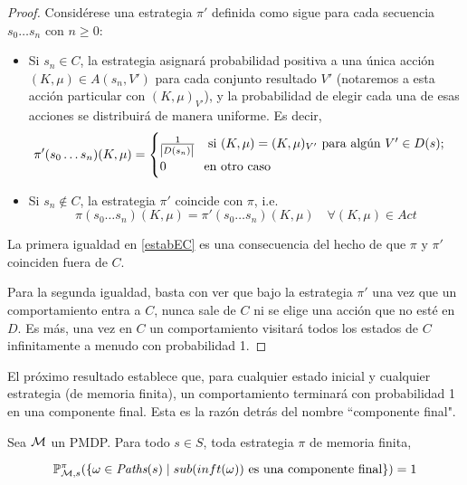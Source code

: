 \begin{proof}
	Considérese una estrategia $\pi'$ definida como sigue para cada secuencia $s_0 \dots s_n$ con $n \geq 0$:

	\begin{itemize}
		\item Si $s_n \in C$, la estrategia asignará probabilidad positiva a una única acción
		      $(K, \mu) \in A(s_n, V')$ para cada conjunto resultado $V'$ (notaremos a esta
		      acción particular con $(K, \mu)_{V'}$), y la probabilidad de elegir cada una de
		      esas acciones se distribuirá de manera uniforme. Es decir,
		      \[
			      \pi'(s_0 \dots s_n)(K, \mu) =
			      \begin{cases}
				      \frac{1}{\abs{D(s_n)}} \quad \text{si } (K, \mu) = (K, \mu)_{V'} \text{ para algún } V' \in D(s); \\
				      0 \qquad \quad \text{en otro caso}
			      \end{cases}
		      \]

		\item Si $s_n \notin C$, la estrategia $\pi'$ coincide con $\pi$, i.e.
		      \[
			      \pi(s_0 \dots s_n)(K, \mu) = \pi'(s_0\dots s_n)(K, \mu) \quad \forall (K, \mu) \in Act
		      \]

	\end{itemize}

	La primera igualdad en \ref{estabEC} es una consecuencia del hecho de que $\pi$
	y $\pi'$ coinciden fuera de $C$.

	Para la segunda igualdad, basta con ver que bajo la estrategia $\pi'$ una vez
	que un comportamiento entra a $C$, nunca sale de $C$ ni se elige una acción que
	no esté en $D$. Es más, una vez en $C$ un comportamiento visitará todos los
	estados de $C$ infinitamente a menudo con probabilidad 1.
\end{proof}

El próximo resultado establece que, para cualquier estado inicial y cualquier
estrategia (de memoria finita), un comportamiento terminará con probabilidad 1
en una componente final. Esta es la razón detrás del nombre ``componente
final".

\begin{theorem} \label{teoFundEC}
	Sea $\mathcal{M}$ un PMDP. Para todo $s \in S$, toda estrategia $\pi$ de memoria finita,

	$$\mathbb{P}^\pi_{\mathcal{M}, s}(\{ \omega \in \textit{Paths}(s) \mid sub(inft(\omega)) \text{ es una componente final}\}) = 1$$
\end{theorem}

